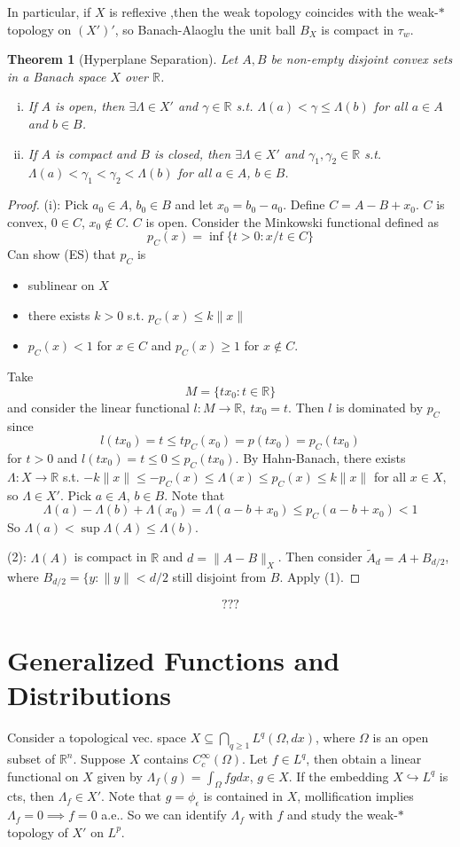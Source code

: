 \documentclass{article}
\theoremstyle{definition}
\theoremstyle{remark}
\theoremstyle{plain}
\newtheorem{thm}[defn]{Theorem}
\newcommand{\RR}{\mathbb{R}}
\begin{document}
In particular, if $X$ is reflexive ,then the weak topology coincides with the weak-$\ast$ topology on $(X')'$, so Banach-Alaoglu the unit ball $B_X$ is compact in $\tau_w$.
\begin{thm}[Hyperplane Separation]
    Let $A,B$ be non-empty disjoint convex sets in a Banach space $X$ over $\RR$.
    \begin{enumerate}[(i)]
        \item If $A$ is open, then $\exists\Lambda\in X'$ and $\gamma\in\RR$ s.t. $\Lambda(a)<\gamma\le \Lambda(b)$ for all $a\in A$ and $b\in B$.
        \item If $A$ is compact and $B$ is closed, then $\exists\Lambda\in X'$ and $\gamma_1,\gamma_2\in\RR$ s.t. $\Lambda(a)<\gamma_1<\gamma_2<\Lambda(b)$ for all $a\in A$, $b\in B$.
    \end{enumerate}
\end{thm}
\begin{proof}
    (i): Pick $a_0\in A$, $b_0\in B$ and let $x_0=b_0-a_0$. Define $C=A-B+x_0$. $C$ is convex, $0\in C$, $x_0\notin C$. $C$ is open. Consider the Minkowski functional defined as 
    \[p_C(x)=\inf\{t>0:x/t\in C\}\]
    Can show (ES) that $p_C$ is 
    \begin{itemize}
        \item sublinear on $X$
        \item there exists $k>0$ s.t. $p_C(x)\le k\|x\|$
        \item $p_C(x)<1$ for $x\in C$ and $p_C(x)\ge 1$ for $x\notin C$.
    \end{itemize}
     Take $$M=\{tx_0:t\in\RR\}$$ and consider the linear functional $l:M\to\RR,\ tx_0=t$. Then $l$ is dominated by $p_C$ since 
     \[l(tx_0)=t\le tp_C(x_0)=p(tx_0)=p_C(tx_0)\]
     for $t>0$ and $l(tx_0)=t\le 0\le p_C(tx_0)$. By Hahn-Banach, there exists $\Lambda:X\to\RR$ s.t. $-k\|x\|\le -p_C(x)\le \Lambda(x)\le p_C(x)\le k\|x\|$ for all $x\in X$, so $\Lambda\in X'$. Pick $a\in A$, $b\in B$. Note that \[\Lambda(a)-\Lambda(b)+\Lambda(x_0)=\Lambda(a-b+x_0)\le p_C(a-b+x_0)<1\]
     So $\Lambda(a)<\sup\Lambda(A)\le \Lambda(b)$.

     (2): $\Lambda(A)$ is compact in $\RR$ and $d=\|A-B\|_X$. Then consider $\tilde A_d=A+B_{d/2}$, where $B_{d/2}=\{y:\|y\|<d/2$ still disjoint from $B$. Apply (1).
\end{proof}
\[???\tag{Owen's missing Signature}\]
\section{Generalized Functions and Distributions}
Consider a topological vec. space $X\subseteq\bigcap_{q\ge 1}L^q(\Omega,dx)$, where $\Omega$ is an open subset of $\RR^n$. Suppose $X$ contains $C_c^\infty(\Omega)$. Let $f\in L^q$, then obtain a linear functional on $X$ given by $\Lambda_f(g)=\int_\Omega fgdx$, $g\in X$. If the embedding $X\hookrightarrow L^q$ is cts, then $\Lambda_f\in X'$. Note that $g=\phi_\epsilon$ is contained in $X$, mollification implies $\Lambda_f=0\implies f=0$ a.e.. So we can identify $\Lambda_f$ with $f$  and study the weak-$\ast$ topology of $X'$ on $L^p$.
\end{document}
